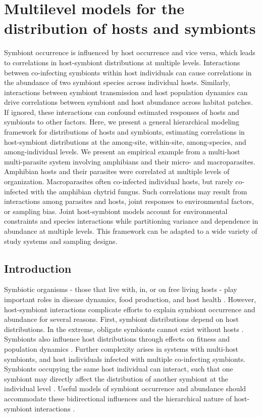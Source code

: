 \chapter{Multilevel models for the distribution of hosts and symbionts}

Symbiont occurrence is influenced by host occurrence and vice versa, which leads to correlations in host-symbiont distributions at multiple levels.
Interactions between co-infecting symbionts within host individuals can cause correlations in the abundance of two symbiont species across individual hosts.
Similarly, interactions between symbiont transmission and host population dynamics can drive correlations between symbiont and host abundance across habitat patches.
If ignored, these interactions can confound estimated responses of hosts and symbionts to other factors.
Here, we present a general hierarchical modeling framework for distributions of hosts and symbionts, estimating correlations in host-symbiont distributions at the among-site, within-site, among-species, and among-individual levels.
We present an empirical example from a multi-host multi-parasite system involving amphibians and their micro- and macroparasites.
Amphibian hosts and their parasites were correlated at multiple levels of organization.
Macroparasites often co-infected individual hosts, but rarely co-infected with the amphibian chytrid fungus.
Such correlations may result from interactions among parasites and hosts, joint responses to environmental factors, or sampling bias.
Joint host-symbiont models account for environmental constraints and species interactions while partitioning variance and dependence in abundance at multiple levels.
This framework can be adapted to a wide variety of study systems and sampling designs.


\section{Introduction}

Symbiotic organisms - those that live with, in, or on free living hosts - play important roles in disease dynamics, food production, and host health \citep{Bashan1998, Jones2008}.
However, host-symbiont interactions complicate efforts to explain symbiont occurrence and abundance for several reasons.
First, symbiont distributions depend on host distributions.
In the extreme, obligate symbionts cannot exist without hosts \citep{Moran2000}.
Symbionts also influence host distributions through effects on fitness and population dynamics \citep{Ebert2000, Lloyd-Smith2005}.
Further complexity arises in systems with multi-host symbionts, and host individuals infected with multiple co-infecting symbionts.
Symbionts occupying the same host individual can interact, such that one symbiont may directly affect the distribution of another symbiont at the individual level \citep{Telfer2010a}.
Useful models of symbiont occurrence and abundance should accommodate these bidirectional influences and the hierarchical nature of host-symbiont interactions \citep{Mihaljevic2012}.


